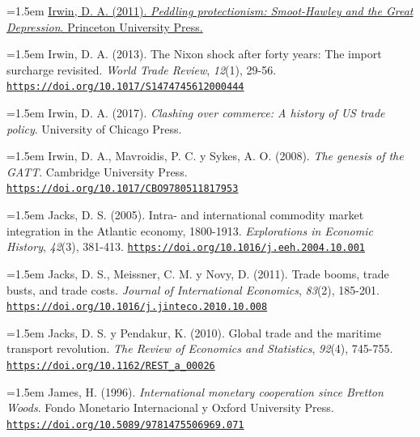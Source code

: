 \documentclass[10pt,a4paper]{article}
\begin{document}
{\sloppy\noindent\hangindent=1.5em \href{https://econpapers.repec.org/RePEc:pup:pbooks:9430}{Irwin, D. A. (2011). \textit{Peddling protectionism: Smoot-Hawley and the Great Depression}. Princeton University Press.}\par}

{\sloppy\noindent\hangindent=1.5em Irwin, D. A. (2013). The Nixon shock after forty years: The import surcharge revisited. \textit{World Trade Review}, \textit{12}(1), 29-56. \href{https://doi.org/10.1017/S1474745612000444}{\nolinkurl{https://doi.org/10.1017/S1474745612000444}}\par}

\noindent\hangindent=1.5em Irwin, D. A. (2017). \textit{Clashing over commerce: A history of US trade policy}. University of Chicago Press.

{\sloppy\noindent\hangindent=1.5em Irwin, D. A., Mavroidis, P. C. y Sykes, A. O. (2008). \textit{The genesis of the GATT}. Cambridge University Press. \href{https://doi.org/10.1017/CBO9780511817953}{\nolinkurl{https://doi.org/10.1017/CBO9780511817953}}\par}

{\sloppy\noindent\hangindent=1.5em Jacks, D. S. (2005). Intra- and international commodity market integration in the Atlantic economy, 1800-1913. \textit{Explorations in Economic History}, \textit{42}(3), 381-413. \href{https://doi.org/10.1016/j.eeh.2004.10.001}{\nolinkurl{https://doi.org/10.1016/j.eeh.2004.10.001}}\par}

{\sloppy\noindent\hangindent=1.5em Jacks, D. S., Meissner, C. M. y Novy, D. (2011). Trade booms, trade busts, and trade costs. \textit{Journal of International Economics}, \textit{83}(2), 185-201. \href{https://doi.org/10.1016/j.jinteco.2010.10.008}{\nolinkurl{https://doi.org/10.1016/j.jinteco.2010.10.008}}\par}

{\sloppy\noindent\hangindent=1.5em Jacks, D. S. y Pendakur, K. (2010). Global trade and the maritime transport revolution. \textit{The Review of Economics and Statistics}, \textit{92}(4), 745-755. \href{https://doi.org/10.1162/REST_a_00026}{\nolinkurl{https://doi.org/10.1162/REST_a_00026}}\par}

{\sloppy\noindent\hangindent=1.5em James, H. (1996). \textit{International monetary cooperation since Bretton Woods}. Fondo Monetario Internacional y Oxford University Press. \href{https://doi.org/10.5089/9781475506969.071}{\nolinkurl{https://doi.org/10.5089/9781475506969.071}}\par}
\end{document}
